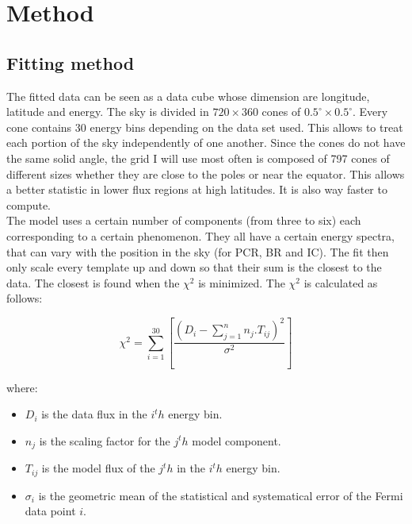 \chapter{Method}
\label{ch:method}

\section{Fitting method}


The fitted data can be seen as a data cube whose dimension are longitude, latitude and energy. The sky is divided in $720\times360$ cones of $ 0.5^\circ \times 0.5^\circ $. Every cone contains 30 energy bins depending on the data set used. This allows to treat each portion of the sky independently of one another. Since the cones do not have the same solid angle, the grid I will use most often is composed of 797 cones of different sizes whether they are close to the poles or near the equator. This allows a better statistic in lower flux regions at high latitudes. It is also way faster to compute. \\

The model uses a certain number of components (from three to six) each corresponding to a certain phenomenon. They all have a certain energy spectra, that can vary with the position in the sky (for PCR, BR and IC). The fit then only scale every template up and down so that their sum is the closest to the data. The closest is found when the $\chi ^2$ is minimized. The $\chi ^2$ is calculated as follows:

\begin{equation}
\chi ^2 = \sum_{i=1}^{30}[\frac{(D_i - \sum_{j=1}^{n}n_j.T_{ij})^2}{\sigma^2}]
\end{equation}

where:
\begin{itemize}
\item $D_i$ is the data flux in the $i^th$ energy bin.
\item $n_j$ is the scaling factor for the $j^th$ model component.
\item $T_{ij}$ is the model flux of the $j^th$ in the $i^th$ energy bin.
\item $\sigma_i$ is the geometric mean of the statistical and systematical error of the Fermi data point $i$.
\end{itemize}

